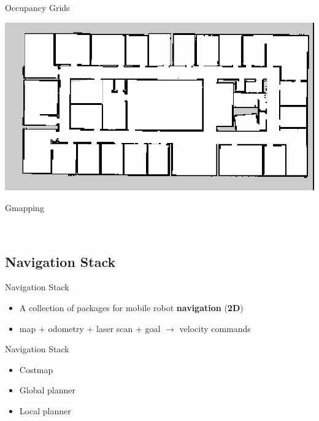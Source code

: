 \documentclass{beamer}
\begin{document}
\begin{frame}{Occupancy Grids} 
	\subtitle{Gmapping}
	\centering
	\includegraphics[width=.99\linewidth]{figures/map.png} 
\end{frame}

\begin{frame}{Gmapping}
		\begin{terminal}
			\color{green} 
		\end{terminal}
\end{frame}

\begin{frame}[plain]{}  
	\centering
	{\huge \textcolor{white}{Gmapping} }
\end{frame}


\subsection{Navigation Stack}

\begin{frame}{Navigation Stack} 
	\begin{itemize}
		\item A collection of packages for mobile robot \textbf{navigation} (\textbf{2D})
		\vspace{0.5cm}
		\item map + odometry + laser scan + goal $\rightarrow$ velocity commands
	\end{itemize}
\end{frame}


\begin{frame}{Navigation Stack} 
	\begin{itemize}
	\item Costmap
	\vspace{0.5cm}
	\item Global planner
	\vspace{0.5cm}
	\item Local planner	
\vspace{0.5cm}	
\end{itemize}
\end{frame}
\end{document}
